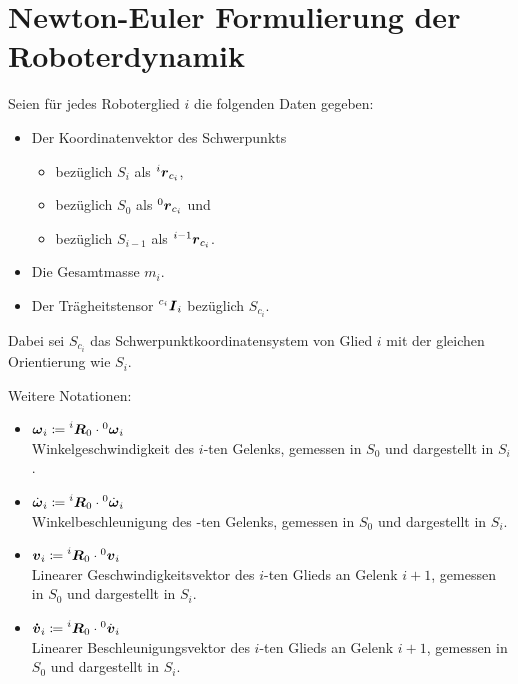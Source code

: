 \documentclass[a4paper, 11pt, accentcolor = tud3b]{tudreport}
\newcommand{\inreferenceto}[2]{\prescript{#1}{}{#2}}
\newcommand{\mat}[1]{\boldsymbol{#1}}
\renewcommand{\vec}[1]{\boldsymbol{#1}}
\begin{document}
		\section{Newton-Euler Formulierung der Roboterdynamik} %
			Seien für jedes Roboterglied \(i\) die folgenden Daten gegeben:
			\begin{itemize}
				\item Der Koordinatenvektor des Schwerpunkts
					\begin{itemize}
						\item bezüglich \(S_i\) als \( \inreferenceto{i}{\vec{r}}_{c_i} \),
						\item bezüglich \(S_0\) als \( \inreferenceto{0}{\vec{r}}_{c_i} \) und
						\item bezüglich \(S_{i - 1}\) als \( \inreferenceto{i - 1}{\vec{r}}_{c_i} \).
					\end{itemize}
				\item Die Gesamtmasse \(m_i\).
				\item Der Trägheitstensor \( \inreferenceto{c_i}{\mat{I}}_i \) bezüglich \( S_{c_i} \).
			\end{itemize}
			Dabei sei \( S_{c_i} \) das Schwerpunktkoordinatensystem von Glied \(i\) mit der gleichen Orientierung wie \( S_i \).
			
			Weitere Notationen:
			\begin{itemize}
				\item \( \vec{\omega}_i \coloneqq \inreferenceto{i}{\mat{R}}_0 \cdot \inreferenceto{0}{\vec{\omega}}_i \) \\
						Winkelgeschwindigkeit des \(i\)-ten Gelenks, gemessen in \(S_0\) und dargestellt in \(S_i\).
				\item \( \dot{\vec{\omega}}_i \coloneqq \inreferenceto{i}{\mat{R}}_0 \cdot \inreferenceto{0}{\dot{\vec{\omega}}}_i \) \\
						Winkelbeschleunigung des \(\)-ten Gelenks, gemessen in \(S_0\) und dargestellt in \(S_i\).
				\item \( \vec{v}_i \coloneqq \inreferenceto{i}{\mat{R}}_0 \cdot \inreferenceto{0}{\vec{v}}_i \) \\
						Linearer Geschwindigkeitsvektor des \(i\)-ten Glieds an Gelenk \(i + 1\), gemessen in \(S_0\) und dargestellt in \(S_i\).
				\item \( \vec{\dot{v}}_i \coloneqq \inreferenceto{i}{\mat{R}}_0 \cdot \inreferenceto{0}{\dot{\vec{v}}}_i \) \\
						Linearer Beschleunigungsvektor des \(i\)-ten Glieds an Gelenk \(i + 1\), gemessen in \(S_0\) und dargestellt in \(S_i\).
			\end{itemize}
\end{document}
